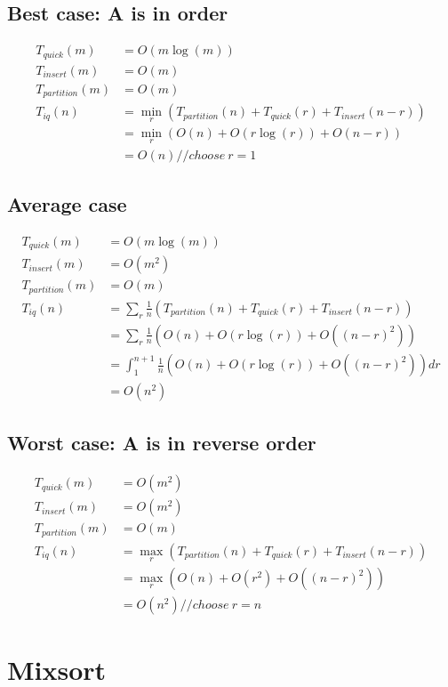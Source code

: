 \documentclass{article}
\begin{document}
\subsection{Best case: A is in order}
\begin{align*}
T_{quick}(m) &= O(m \log(m))\\
T_{insert}(m) &= O(m)\\
T_{partition}(m) &= O(m)\\
T_{iq}(n)
&= \min_r (T_{partition}(n) + T_{quick}(r) + T_{insert}(n-r))\\
&= \min_r(O(n) + O(r \log(r)) + O(n-r))\\
&= O(n) // choose \ r = 1
\end{align*}

\subsection{Average case}
\begin{align*}
T_{quick}(m) &= O(m \log(m))\\
T_{insert}(m) &= O(m^2)\\
T_{partition}(m) &= O(m)\\
T_{iq}(n)
&= \sum_r \frac{1}{n}(T_{partition}(n) + T_{quick}(r) + T_{insert}(n-r))\\
&= \sum_r \frac{1}{n} (O(n) + O(r \log(r)) + O((n-r)^2))\\
&= \int_1^{n+1} \frac{1}{n} (O(n) + O(r \log(r)) + O((n-r)^2)) d r\\
&= O(n^2)
\end{align*}

\subsection{Worst case: A is in reverse order}
\begin{align*}
T_{quick}(m) &= O(m^2)\\
T_{insert}(m) &= O(m^2)\\
T_{partition}(m) &= O(m)\\
T_{iq}(n)
&= \max_r (T_{partition}(n) + T_{quick}(r) + T_{insert}(n-r))\\
&= \max_r(O(n) + O(r^2) + O((n-r)^2))\\
&= O(n^2) // choose \ r = n
\end{align*}

\section{Mixsort}
\end{document}
